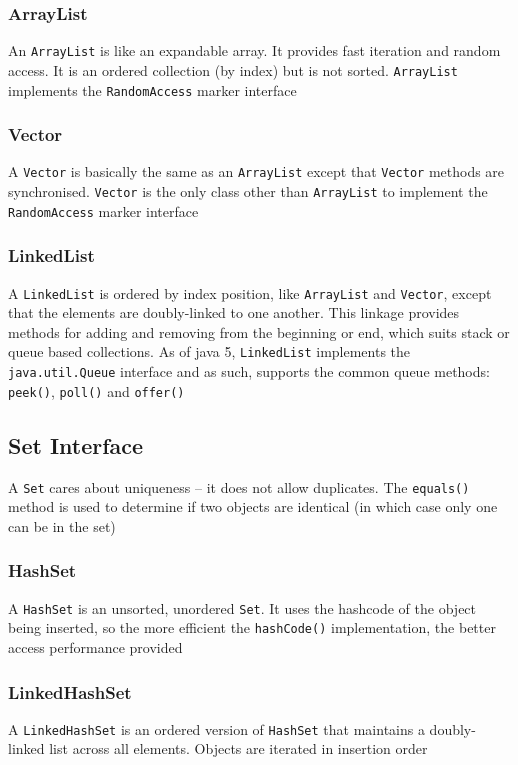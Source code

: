 \subsubsection{ArrayList}
An \verb#ArrayList# is like an expandable array. It provides fast iteration and 
random access. It is an ordered collection (by index) but is not sorted.  
\verb#ArrayList# implements the \verb#RandomAccess# marker interface

\subsubsection{Vector}
A \verb#Vector# is basically the same as an \verb#ArrayList# except that 
\verb#Vector# methods are synchronised. \verb#Vector# is the only class other 
than \verb#ArrayList# to implement the \verb#RandomAccess# marker interface

\subsubsection{LinkedList}
A \verb#LinkedList# is ordered by index position, like \verb#ArrayList# and 
\verb#Vector#, except that the elements are doubly-linked to one another. This 
linkage provides methods for adding and removing from the beginning or end, 
which suits stack or queue based collections. As of java 5, \verb#LinkedList# 
implements the \verb#java.util.Queue# interface and as such, supports the 
common queue methods: \verb#peek()#, \verb#poll()# and \verb#offer()#

\subsection{Set Interface}
A \verb#Set# cares about uniqueness -- it does not allow duplicates. The 
\verb#equals()# method is used to determine if two objects are identical (in 
which case only one can be in the set)

\subsubsection{HashSet}
A \verb#HashSet# is an unsorted, unordered \verb#Set#. It uses the hashcode of 
the object being inserted, so the more efficient the \verb#hashCode()# 
implementation, the better access performance provided

\subsubsection{LinkedHashSet}
A \verb#LinkedHashSet# is an ordered version of \verb#HashSet# that maintains a 
doubly-linked list across all elements. Objects are iterated in insertion order

